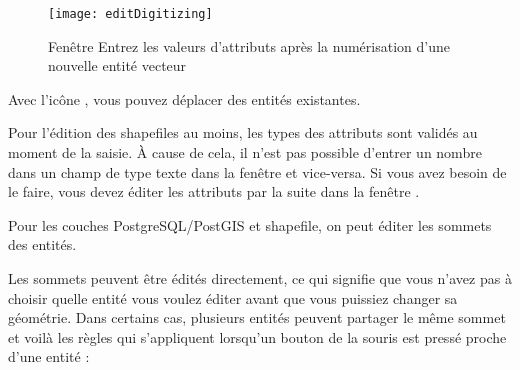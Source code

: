 \begin{figure}[ht]
  \begin{center}
 
  \texttt{[image: editDigitizing]}
  \caption{Fenêtre Entrez les valeurs d'attributs après la numérisation d'une nouvelle entité vecteur \nixcaption}\label{fig:vector_digitising}
\end{center}
\end{figure}

Avec l'icône , vous pouvez déplacer des entités existantes.

\begin{Tip}[ht]\caption{\textsc{Types des valeurs d'attribut}}
Pour l'édition des shapefiles au moins, les types des attributs sont validés au moment de la saisie. À cause de cela, il n'est pas possible d'entrer un nombre dans un champ de type texte dans la fenêtre  et vice-versa. Si vous avez besoin de le faire, vous devez éditer les attributs par la suite dans la fenêtre .
\end{Tip}


Pour les couches PostgreSQL/PostGIS et shapefile, on peut éditer les sommets des entités.

Les sommets peuvent être édités directement, ce qui signifie que vous n'avez pas à choisir quelle entité vous voulez éditer avant que vous puissiez changer sa géométrie. Dans certains cas, plusieurs entités peuvent partager le même sommet et voilà les règles qui s'appliquent lorsqu'un bouton de la souris est pressé proche d'une entité :

